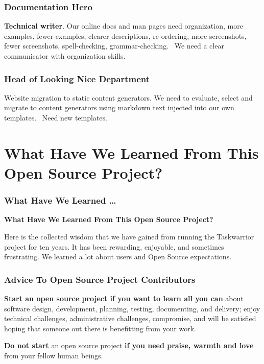 \documentclass[t,handout]{beamer}
\begin{document}
\begin{frame}[fragile]\frametitle{Documentation Hero}
    \vfill
    \textbf{Technical writer}. Our online docs and man pages need organization, more examples, fewer examples, clearer descriptions, re-ordering, more screenshots, fewer screenshots, spell-checking, grammar-checking.  We need a clear communicator with organization skills.
\end{frame}

\begin{frame}[fragile]\frametitle{Head of Looking Nice Department}
    \vfill
    Website migration to static content generators. We need to evaluate, select and migrate to content generators using markdown text injected into our own templates.  Need new templates.
\end{frame}

\section{What Have We Learned From This Open Source Project?}

\begin{frame}[fragile]\frametitle{What Have We Learned \ldots}
    \vfill
    \textbf{What Have We Learned From This Open Source Project?}

    Here is the collected wisdom that we have gained from running the Taskwarrior project for ten years. It has been rewarding, enjoyable, and sometimes frustrating. We learned a lot about users and Open Source expectations.
    \vfill
\end{frame}

\begin{frame}[fragile]\frametitle{Advice To Open Source Project Contributors}
    \vfill
    \textbf{Start an open source project if you want to learn all you can} about software design, development, planning, testing, documenting, and delivery; enjoy technical challenges, administrative challenges, compromise, and will be satisfied hoping that someone out there is benefitting from your work.

    \textbf{Do not start} an open source project \textbf{if you need praise, warmth and love} from your fellow human beings.
    \vfill
\end{frame}
\end{document}
